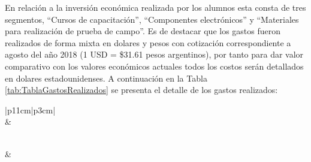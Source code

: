 \begin{itemize}
        \par En relación a la inversión económica realizada por los alumnos esta consta de tres segmentos, ``Cursos de capacitación'', ``Componentes electrónicos'' y ``Materiales para realización de prueba de campo''. Es de destacar que los gastos fueron realizados de forma mixta en dolares y pesos con cotización correspondiente a agosto del año 2018 (1 USD = \$31.61 pesos argentinos), por tanto para dar valor comparativo con los valores económicos actuales todos los costos serán detallados en dolares estadounidenses. A continuación en la Tabla \ref{tab:TablaGastosRealizados} se presenta el detalle de los gastos realizados:
        \begin{longtable}{|p{11cm}|p{3cm}|}
                \hline
                \\
                \hline
                 &\\
                \hline
                \hline
            \endfirsthead
         
                \hline
                \\
                \hline
                 &\\
                \hline
            \endhead
         

\end{longtable}
\end{itemize}
